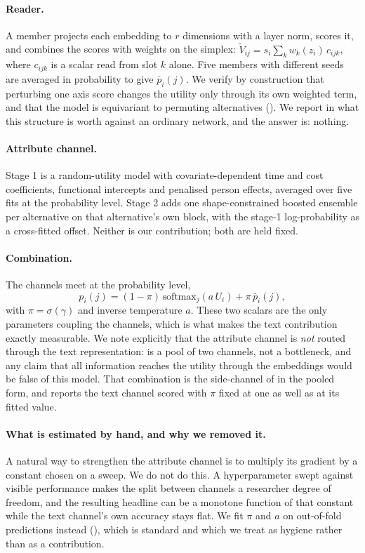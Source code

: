 \paragraph{Reader.} A member projects each embedding to $r$ dimensions with a layer norm,
scores it, and combines the scores with weights on the simplex:
$\tilde V_{ij} = s_i \sum_k w_k(z_i)\, c_{ijk}$, where $c_{ijk}$ is a scalar read from slot $k$
alone. Five members with different seeds are averaged in probability to give $\bar p_i(j)$. We
verify by construction that perturbing one axis score changes the utility only through its own
weighted term, and that the model is equivariant to permuting alternatives
(). We report in  what this structure is worth against an
ordinary network, and the answer is: nothing.

\paragraph{Attribute channel.} Stage 1 is a random-utility model with covariate-dependent
time and cost coefficients, functional intercepts and penalised person effects, averaged over
five fits at the probability level. Stage 2 adds one shape-constrained boosted ensemble per
alternative on that alternative's own block, with the stage-1 log-probability as a cross-fitted
offset. Neither is our contribution; both are held fixed.

\paragraph{Combination.} The channels meet at the probability level,
\begin{equation}
p_i(j) = (1-\pi)\,\mathrm{softmax}_j(a\,U_i) + \pi\, \bar p_i(j),
\label{eq:mixture}
\end{equation}
with $\pi = \sigma(\gamma)$ and inverse temperature $a$. These two scalars are the only
parameters coupling the channels, which is what makes the text contribution exactly
measurable. We note explicitly that the attribute channel is \emph{not} routed through the
text representation:  is a pool of two channels, not a bottleneck, and any
claim that all information reaches the utility through the embeddings would be false of this
model. That combination is the side-channel of \citet{havasi2022addressing} in the pooled
form, and  reports the text channel scored with $\pi$ fixed at one as well
as at its fitted value.

\paragraph{What is estimated by hand, and why we removed it.} A natural way to strengthen the
attribute channel is to multiply its gradient by a constant chosen on a sweep. We do not do
this. A hyperparameter swept against visible performance makes the split between channels a
researcher degree of freedom, and the resulting headline can be a monotone function of that
constant while the text channel's own accuracy stays flat. We fit $\pi$ and $a$ on out-of-fold
predictions instead (), which is standard \citep{vanderlaan2007super} and
which we treat as hygiene rather than as a contribution.
